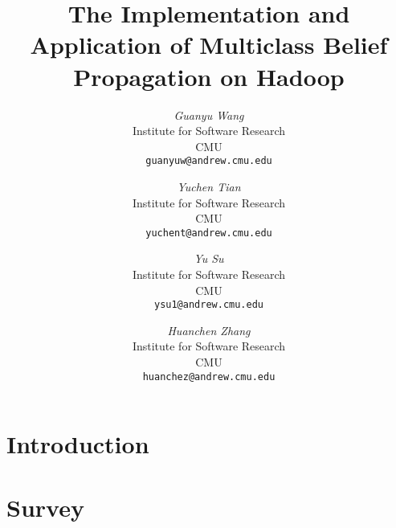 \documentclass[12pt]{article}
\begin{document}
\newcommand{\beq}{\begin{equation}}
\newcommand{\eeq}{\end{equation}}
\newcommand{\bit}{\begin{itemize*}}
\newcommand{\eit}{\end{itemize*}}
\newcommand{\goal}[1]{ {\noindent {$\Rightarrow$} \em {#1} } }
\newcommand{\hide}[1]{}
\newcommand{\comment}[1]{ {\footnotesize {#1} } }
\newtheorem{lemma}{Lemma}
\newtheorem{theorem}{Theorem}
\newtheorem{proof}{Proof}
\newtheorem{defn}{Definition}
\newtheorem{algo}{Algorithm}
\newtheorem{observation}{Observation}

\title{The Implementation and Application of Multiclass Belief Propagation on Hadoop}


\author{ {\em Guanyu Wang} \\
	    Institute for Software Research \\
	    CMU\\
	    {\tt guanyuw@andrew.cmu.edu}
	 \and
	 {\em Yuchen Tian} \\
	     Institute for Software Research \\
	     CMU\\
	     {\tt yuchent@andrew.cmu.edu}
	 \and
	 {\em Yu Su} \\
	      Institute for Software Research \\
	      CMU\\
	      {\tt ysu1@andrew.cmu.edu}
	\and
	{\em Huanchen Zhang} \\
	      Institute for Software Research \\
	      CMU\\
	      {\tt huanchez@andrew.cmu.edu}
}


\maketitle
%    

\section{Introduction}
    \label{sec:intro}
    

\section{Survey}
    \label{sec:survey}
    
\end{document}
